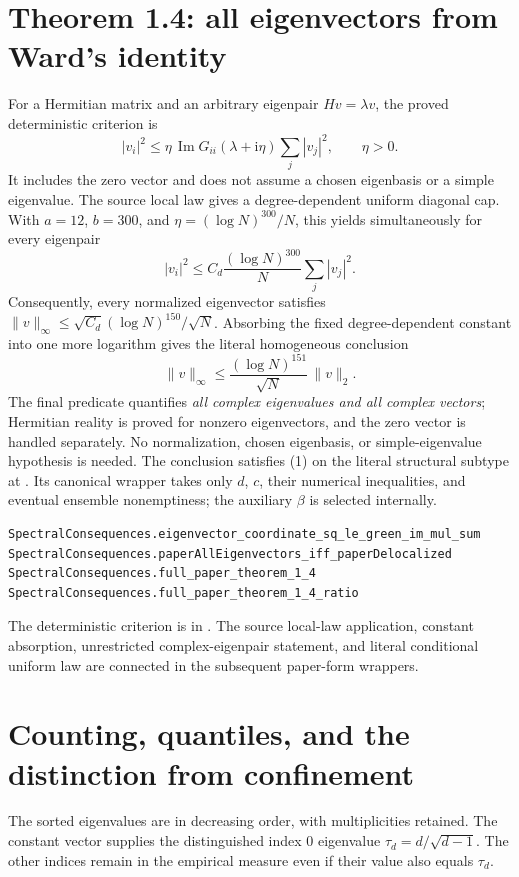 \documentclass[11pt]{article}
\newcommand{\code}[1]{\texttt{\small\detokenize{#1}}}
\newcommand{\im}{\operatorname{Im}}
\begin{document}
\section{Theorem 1.4: all eigenvectors from Ward's identity}

For a Hermitian matrix and an arbitrary eigenpair $Hv=\lambda v$, the proved deterministic
criterion is
\[
 |v_i|^2\leq \eta\,\im G_{ii}(\lambda+\mathrm i\eta)
                  \sum_j|v_j|^2,\qquad \eta>0.
 \tag{2}
\]
It includes the zero vector and does not assume a chosen eigenbasis or a simple eigenvalue.
The source local law gives a degree-dependent uniform diagonal cap. With $a=12$, $b=300$,
and $\eta=(\log N)^{300}/N$, this yields simultaneously for every eigenpair
\[
 |v_i|^2\leq C_d\frac{(\log N)^{300}}{N}\sum_j|v_j|^2 .
 \tag{3}
\]
Consequently, every normalized eigenvector satisfies
$\|v\|_\infty\leq\sqrt{C_d}(\log N)^{150}/\sqrt N$.
Absorbing the fixed degree-dependent constant into one more logarithm gives the literal
homogeneous conclusion
\[
 \|v\|_\infty\leq\frac{(\log N)^{151}}{\sqrt N}\,\|v\|_2 .
\]
The final predicate quantifies \emph{all complex eigenvalues and all complex vectors};
Hermitian reality is proved for nonzero eigenvectors, and the zero vector is handled
separately. No normalization, chosen eigenbasis, or simple-eigenvalue hypothesis is needed.
The conclusion satisfies (1) on the literal structural subtype at \code{paperOmega d}.
Its canonical wrapper takes only $d$, $c$, their numerical inequalities, and eventual
ensemble nonemptiness; the auxiliary $\beta$ is selected internally.

\begin{lstlisting}
SpectralConsequences.eigenvector_coordinate_sq_le_green_im_mul_sum
SpectralConsequences.paperAllEigenvectors_iff_paperDelocalized
SpectralConsequences.full_paper_theorem_1_4
SpectralConsequences.full_paper_theorem_1_4_ratio
\end{lstlisting}
The deterministic criterion is in \code{EigenvectorWard.lean}. The source local-law
application, constant absorption, unrestricted complex-eigenpair statement, and literal
conditional uniform law are connected in the subsequent paper-form wrappers.

\section{Counting, quantiles, and the distinction from confinement}

The sorted eigenvalues are in decreasing order, with multiplicities retained.
The constant vector supplies the distinguished index $0$ eigenvalue
$\tau_d=d/\sqrt{d-1}$. The other indices remain in the empirical measure even if their
value also equals $\tau_d$.
\end{document}
